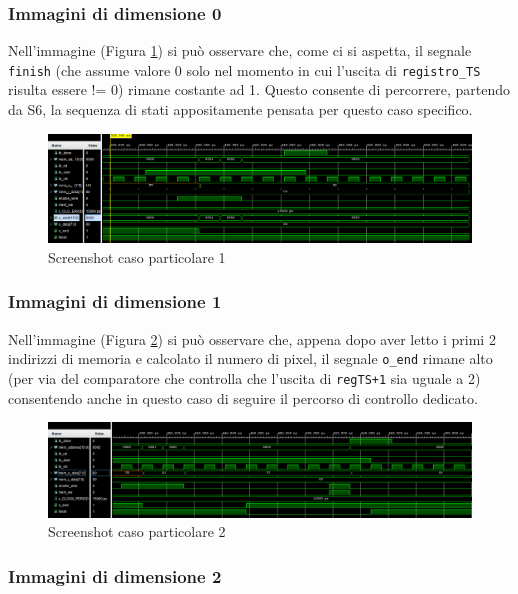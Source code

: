 \subsubsection{Immagini di dimensione 0}

Nell'immagine (Figura \ref{0}) si può osservare che, come ci si aspetta, il segnale \texttt{finish} (che assume valore 0 solo nel momento in cui l'uscita di \texttt{registro\_TS} risulta essere != 0) rimane costante ad 1.
Questo consente di percorrere, partendo da S6, la sequenza di stati appositamente pensata per questo caso specifico.

\begin{figure}[h!]
    \centering
    \includegraphics[scale = 0.3919]{Figure/TB_0x0.PNG}
    \caption{Screenshot caso particolare 1}
    \label{0}
\end{figure}

\clearpage

\subsubsection{Immagini di dimensione 1}
Nell'immagine (Figura \ref{1}) si può osservare che, appena dopo aver letto i primi 2 indirizzi di memoria e calcolato il numero di pixel, il segnale \texttt{o\_end} rimane alto (per via del comparatore che controlla che l'uscita di \texttt{regTS+1} sia uguale a 2) consentendo anche in questo caso di seguire il percorso di controllo dedicato. 


\begin{figure}[h!]
    \centering
    \includegraphics[scale = 0.3793]{Figure/TB_1x1.PNG}
    \caption{Screenshot caso particolare 2}
    \label{1}
\end{figure}

\subsubsection{Immagini di dimensione 2} %


